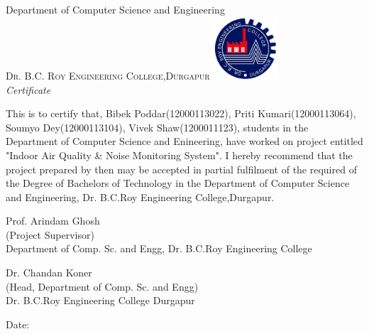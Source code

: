 \newpage
\thispagestyle{empty}

\begin{center}

\huge{Department of Computer Science and Engineering}\\[0.5cm]
\normalsize
\textsc{Dr. B.C. Roy Engineering College,Durgapur}
\vfill
\includegraphics[width=0.18\textwidth]{./logo}\\[0.1in]

\emph{\LARGE Certificate}\\[1cm]
\end{center}
\normalsize This is to certify that, Bibek Poddar(12000113022), Priti Kumari(12000113064), Soumyo Dey(12000113104), Vivek Shaw(1200011123), students in the Department of Computer Science and Enineering, have worked on project entitled "Indoor Air Quality \& Noise Monitoring System".
I hereby recommend that the project prepared by then may be accepted in partial  fulfilment of the required of the Degree of Bachelors of Technology in the Department of Computer Science and Engineering, Dr. B.C.Roy Engineering College,Durgapur.


\vfill


\begin{flushright}
Prof. Arindam Ghosh\\
(Project Supervisor)\\
Department of Comp. Sc. and Engg,
Dr. B.C.Roy Engineering College\\[1.5cm]
\end{flushright}

\begin{flushright}
Dr. Chandan Koner\\
(Head, Department of Comp. Sc. and Engg)\\
Dr. B.C.Roy Engineering College
Durgapur
\\
\end{flushright}

\begin{flushleft}
Date:
\end{flushleft}
